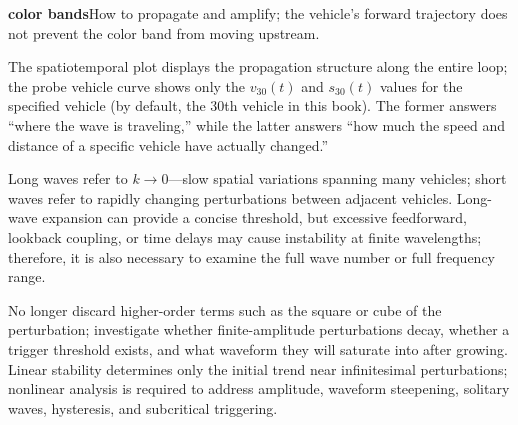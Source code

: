 \documentclass[11pt,a4paper,openany]{book}
\numberwithin{equation}{chapter}
\numberwithin{figure}{chapter}
\numberwithin{table}{chapter}
\begin{document}
\begin{description}[style=unboxed,leftmargin=0pt,labelindent=0pt,labelsep=0.5em,itemsep=0.65em,font=\normalfont\bfseries\color{navy}]
\textbf{color bands}How to propagate and amplify; the vehicle’s forward trajectory does not prevent the color band from moving upstream.










\item[Speed color bands and probe vehicle]







The spatiotemporal plot displays the propagation structure along the entire loop; the probe vehicle curve shows only the $v_{30}(t)$ and $s_{30}(t)$ values for the specified vehicle (by default, the 30th vehicle in this book). The former answers “where the wave is traveling,” while the latter answers “how much the speed and distance of a specific vehicle have actually changed.”










\item[Long and short waves]







Long waves refer to $k\to0$—slow spatial variations spanning many vehicles; short waves refer to rapidly changing perturbations between adjacent vehicles. Long-wave expansion can provide a concise threshold, but excessive feedforward, lookback coupling, or time delays may cause instability at finite wavelengths; therefore, it is also necessary to examine the full wave number or full frequency range.










\item[Nonlinear stability（nonlinear stability）]







No longer discard higher-order terms such as the square or cube of the perturbation; investigate whether finite-amplitude perturbations decay, whether a trigger threshold exists, and what waveform they will saturate into after growing. Linear stability determines only the initial trend near infinitesimal perturbations; nonlinear analysis is required to address amplitude, waveform steepening, solitary waves, hysteresis, and subcritical triggering.











\end{description}
\end{document}
